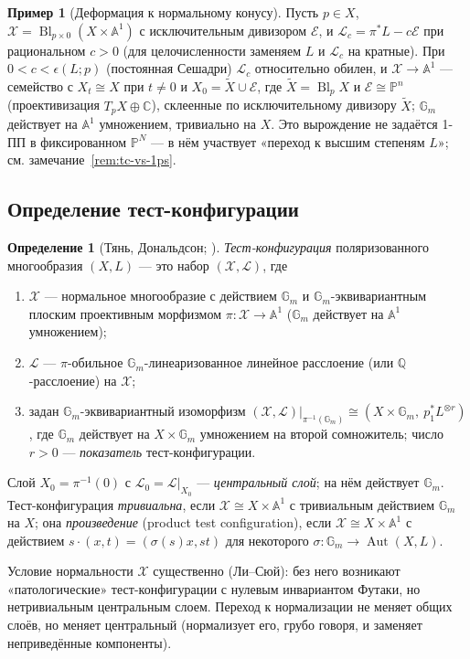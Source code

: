 \documentclass[11pt,a4paper]{article}
\theoremstyle{plain}
\theoremstyle{definition}
\newtheorem{definition}[theorem]{Определение}
\newtheorem{example}[theorem]{Пример}
\theoremstyle{remark}
\renewcommand{\C}{\mathbb{C}}
\newcommand{\Q}{\mathbb{Q}}
\newcommand{\PP}{\mathbb{P}}
\newcommand{\A}{\mathbb{A}}
\newcommand{\Gm}{\mathbb{G}_m}
\newcommand{\cL}{\mathcal{L}}
\newcommand{\cX}{\mathcal{X}}
\DeclareMathOperator{\Bl}{Bl}
\DeclareMathOperator{\Aut}{Aut}
\begin{document}
\begin{example}[Деформация к нормальному конусу]\label{ex:normal-cone}
Пусть $p\in X$, $\cX=\Bl_{p\times0}(X\times\A^1)$ с исключительным дивизором $\mathcal E$, и
$\cL_c=\pi^*L-c\mathcal E$ при рациональном $c>0$ (для целочисленности заменяем $L$ и $\cL_c$ на
кратные). При $0<c<\epsilon(L;p)$ (постоянная Сешадри) $\cL_c$ относительно обилен, и
$\cX\to\A^1$ --- семейство с $X_t\cong X$ при $t\ne0$ и $X_0=\tilde X\cup\mathcal E$, где
$\tilde X=\Bl_pX$ и $\mathcal E\cong\PP^n$ (проективизация $T_pX\oplus\C$), склеенные по
исключительному дивизору $\tilde X$; $\Gm$ действует на $\A^1$ умножением, тривиально на $X$.
Это вырождение не задаётся 1-ПП в фиксированном $\PP^N$ --- в нём участвует «переход к высшим
степеням $L$»; см. замечание~\ref{rem:tc-vs-1ps}.
\end{example}

\subsection{Определение тест-конфигурации}

\begin{definition}[{Тянь, Дональдсон; \cite[2.1]{Xu}}]\label{def:tc}
\emph{Тест-конфигурация} поляризованного многообразия $(X,L)$ --- это набор $(\cX,\cL)$, где
\begin{enumerate}
\item $\cX$ --- нормальное многообразие с действием $\Gm$ и $\Gm$-эквивариантным плоским проективным
морфизмом $\pi\colon\cX\to\A^1$ ($\Gm$ действует на $\A^1$ умножением);
\item $\cL$ --- $\pi$-обильное $\Gm$-линеаризованное линейное расслоение (или $\Q$-расслоение) на
$\cX$;
\item задан $\Gm$-эквивариантный изоморфизм $(\cX,\cL)|_{\pi^{-1}(\Gm)}\cong(X\times\Gm,\ p_1^*L^{\otimes r})$,
где $\Gm$ действует на $X\times\Gm$ умножением на второй сомножитель; число $r>0$ --- \emph{показатель}
тест-конфигурации.
\end{enumerate}
Слой $X_0=\pi^{-1}(0)$ с $\cL_0=\cL|_{X_0}$ --- \emph{центральный слой}; на нём действует $\Gm$.
Тест-конфигурация \emph{тривиальна}, если $\cX\cong X\times\A^1$ с тривиальным действием $\Gm$ на
$X$; она \emph{произведение} (product test configuration), если $\cX\cong X\times\A^1$ с действием
$s\cdot(x,t)=(\sigma(s)x,st)$ для некоторого $\sigma\colon\Gm\to\Aut(X,L)$.
\end{definition}

Условие нормальности $\cX$ существенно (Ли--Сюй): без него возникают «патологические»
тест-конфигурации с нулевым инвариантом Футаки, но нетривиальным центральным слоем. Переход к
нормализации не меняет общих слоёв, но меняет центральный (нормализует его, грубо говоря, и
заменяет неприведённые компоненты).
\end{document}
